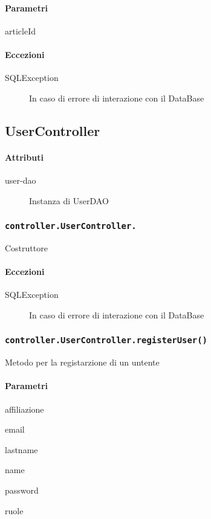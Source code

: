 \paragraph{Parametri}
\begin{description}
\item articleId
\end{description}
\paragraph{Eccezioni}
\begin{description}
\item[SQLException] In caso di errore di interazione con il DataBase
\end{description}

\subsection{UserController}
\paragraph{Attributi}
\begin{description}
\item[user-dao] Instanza di UserDAO
\end{description}

\subsubsection{\texttt{controller.UserController.}}
Costruttore
\paragraph{Eccezioni}
\begin{description}
\item[SQLException] In caso di errore di interazione con il DataBase
\end{description}

\subsubsection{\texttt{controller.UserController.registerUser()}}
Metodo per la registarzione di un untente
\paragraph{Parametri}
\begin{description}
\item affiliazione
\item email
\item lastname
\item name
\item password
\item ruole
\end{description}

